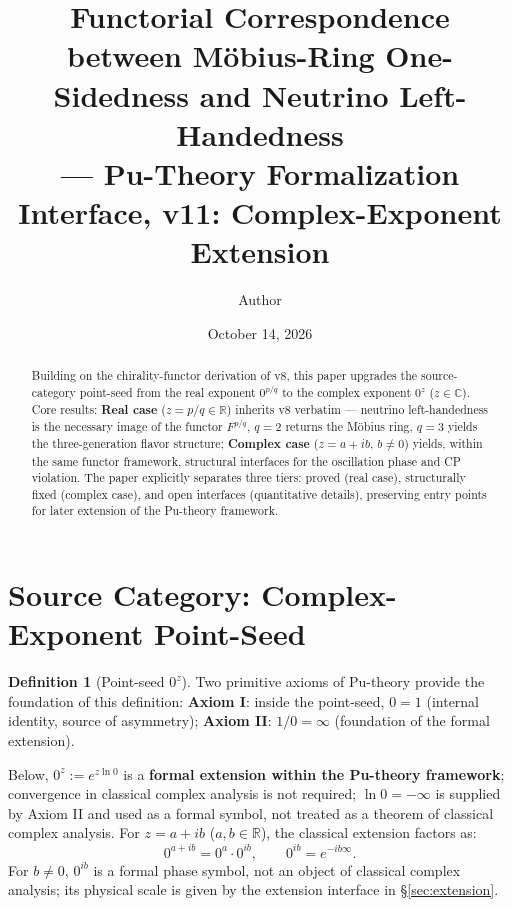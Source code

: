 \documentclass[11pt]{article}
\theoremstyle{plain}
\theoremstyle{definition}
\newtheorem{defn}[thm]{Definition}
\begin{document}
\title{Functorial Correspondence between M\"obius-Ring One-Sidedness
and Neutrino Left-Handedness\\
{\large --- Pu-Theory Formalization Interface, v11: Complex-Exponent Extension}}
\author{Author}
\date{October 14, 2026}
\maketitle

\begin{abstract}
Building on the chirality-functor derivation of v8, this paper upgrades the
source-category point-seed from the real exponent $0^{p/q}$ to the complex
exponent $0^{z}$ ($z\in\mathbb{C}$). Core results:
\textbf{Real case} ($z=p/q\in\mathbb{R}$) inherits v8 verbatim --- neutrino
left-handedness is the necessary image of the functor $F^{p/q}$, $q=2$
returns the M\"obius ring, $q=3$ yields the three-generation flavor
structure; \textbf{Complex case} ($z=a+ib$, $b\neq 0$) yields, within the
same functor framework, structural interfaces for the oscillation phase and
CP violation. The paper explicitly separates three tiers: proved (real
case), structurally fixed (complex case), and open interfaces (quantitative
details), preserving entry points for later extension of the Pu-theory
framework.
\end{abstract}

\section{Source Category: Complex-Exponent Point-Seed}

\begin{defn}[Point-seed $0^z$]\label{def:pointseed}
Two primitive axioms of Pu-theory provide the foundation of this definition:
\textbf{Axiom I}: inside the point-seed, $0=1$ (internal identity, source of
asymmetry); \textbf{Axiom II}: $1/0=\infty$ (foundation of the formal
extension).

Below, $0^z := e^{z\ln 0}$ is a \textbf{formal extension within the Pu-theory
framework}; convergence in classical complex analysis is not required;
$\ln 0 = -\infty$ is supplied by Axiom II and used as a formal symbol, not
treated as a theorem of classical complex analysis. For
$z = a+ib$ ($a,b\in\mathbb{R}$), the classical extension factors as:
\[
0^{a+ib} = 0^a\cdot 0^{ib},\qquad 0^{ib} = e^{-ib\infty}.
\]
For $b\neq 0$, $0^{ib}$ is a formal phase symbol, not an object of classical
complex analysis; its physical scale is given by the extension interface in
\S\ref{sec:extension}.
\end{defn}
\end{document}

